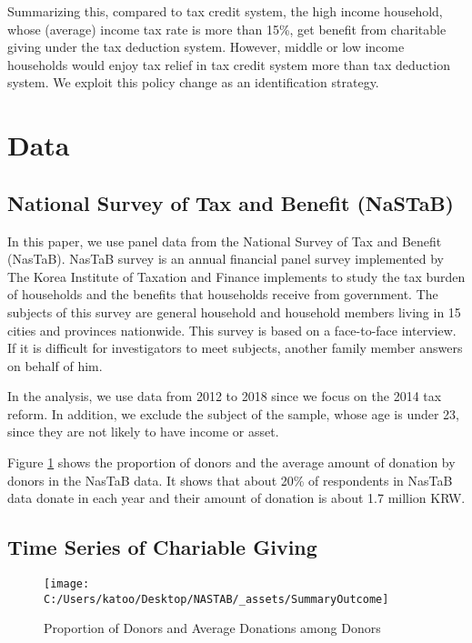 \documentclass[ review  , 3p ]{elsarticle}
\begin{document}
  Summarizing this, compared to tax credit system, the high income household, whose (average) income tax rate is more than 15\%, get benefit from charitable giving under the tax deduction system. However, middle or low income households would enjoy tax relief in tax credit system more than tax deduction system. We exploit this policy change as an identification strategy.

  \hypertarget{data}{%
  \section{Data}\label{data}}

  \hypertarget{national-survey-of-tax-and-benefit-nastab}{%
  \subsection{National Survey of Tax and Benefit (NaSTaB)}\label{national-survey-of-tax-and-benefit-nastab}}

  In this paper, we use panel data from the National Survey of Tax and Benefit (NasTaB).
  NasTaB survey is an annual financial panel survey implemented by The Korea Institute of Taxation and Finance implements to study the tax burden of households and the benefits that households receive from government. The subjects of this survey are general household and household members living in 15 cities and provinces nationwide. This survey is based on a face-to-face interview. If it is difficult for investigators to meet subjects, another family member answers on behalf of him.

  In the analysis, we use data from 2012 to 2018 since \color{red}we focus on the 2014 tax reform.
  \color{black}In addition, we exclude the subject of the sample, whose age is under 23, since they are not likely to have income or asset.

  Figure \ref{fig:figDonationRate} shows the proportion of donors and the average amount of donation by donors in the NasTaB data. It shows that about 20\% of respondents in NasTaB data donate in each year and their amount of donation is about 1.7 million KRW.

  \hypertarget{time-series-of-chariable-giving}{%
  \subsection{Time Series of Chariable Giving}\label{time-series-of-chariable-giving}}

  \begin{figure}

  {\centering \texttt{[image: C:/Users/katoo/Desktop/NASTAB/\_assets/SummaryOutcome]} 

  }

  \caption{Proportion of Donors and Average Donations among Donors}\label{fig:figDonationRate}
  \end{figure}
\end{document}
